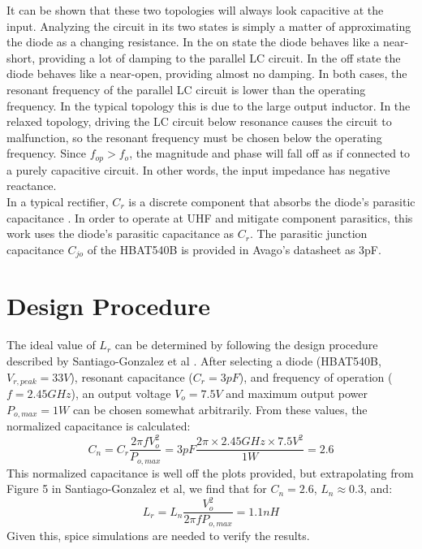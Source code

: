 \documentclass[11pt, a4paper]{article}
\begin{document}
It can be shown that these two topologies will always look capacitive at the input.  
Analyzing the circuit in its two states is simply a matter of approximating the diode as a changing resistance.
In the on state the diode behaves like a near-short, providing a lot of damping to the parallel LC circuit.
In the off state the diode behaves like a near-open, providing almost no damping.
In both cases, the resonant frequency of the parallel LC circuit is lower than the operating frequency.
In the typical topology this is due to the large output inductor.
In the relaxed topology, driving the LC circuit below resonance causes the circuit to malfunction, so the resonant frequency must be chosen below the operating frequency.
Since $f_{op} > f_o$, the magnitude and phase will fall off as if connected to a purely capacitive circuit.  In other words, the input impedance has negative reactance. \\

In a typical rectifier, $C_r$ is a discrete component that absorbs the diode's parasitic capacitance \cite{santiago}.
In order to operate at UHF and mitigate component parasitics, this work uses the diode's parasitic capacitance as $C_r$.
The parasitic junction capacitance $C_{jo}$ of the HBAT540B is provided in Avago's datasheet as 3pF.\\

\section{Design Procedure}

The ideal value of $L_r$ can be determined by following the design procedure described by Santiago-Gonzalez et al \cite{santiago}.  
After selecting a diode (HBAT540B, $V_{r,peak}=33V$), resonant capacitance ($C_r=3pF$), and frequency of operation ($f=2.45GHz$), an output voltage $V_o=7.5V$ and maximum output power $P_{o,max}=1W$ can be chosen somewhat arbitrarily.  
From these values, the normalized capacitance is calculated:
\begin{equation*}
C_n=C_r\frac{2\pi f V_o^2}{P_{o,max}}=3pF \frac{2\pi\times2.45GHz\times7.5V^2}{1W}=2.6
\end{equation*}
This normalized capacitance is well off the plots provided, but extrapolating from Figure 5 in Santiago-Gonzalez et al, we find that for $C_n=2.6$, $L_n\approx0.3$, and:  
\begin{equation*}
L_r=L_n\frac{V_o^2}{2\pi fP_{o,max}}=1.1nH
\end{equation*}
Given this, spice simulations are needed to verify the results.
\end{document}
